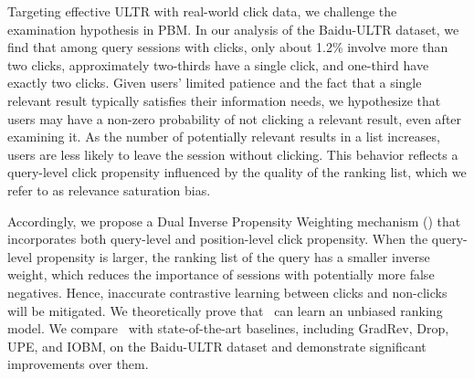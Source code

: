 Targeting effective ULTR with real-world click data, we challenge the examination hypothesis in PBM. In our analysis of the Baidu-ULTR dataset, we find that among query sessions with clicks, only about 1.2\% involve more than two clicks, approximately two-thirds have a single click, and one-third have exactly two clicks. Given users' limited patience and the fact that a single relevant result typically satisfies their information needs, we hypothesize that users may have a non-zero probability of not clicking a relevant result, even after examining it. As the number of potentially relevant results in a list increases, users are less likely to leave the session without clicking. This behavior reflects a query-level click propensity influenced by the quality of the ranking list, which we refer to as relevance saturation bias.

Accordingly, we propose a Dual Inverse Propensity Weighting mechanism (\m) that incorporates both query-level and position-level click propensity. When the query-level propensity is larger, the ranking list of the query has a smaller inverse weight, which reduces the importance of sessions with potentially more false negatives. Hence, inaccurate contrastive learning between clicks and non-clicks will be mitigated. We theoretically prove that \m~can learn an unbiased ranking model. We compare \m~with state-of-the-art baselines, including GradRev, Drop, UPE, and IOBM, on the Baidu-ULTR dataset and demonstrate significant improvements over them. 



